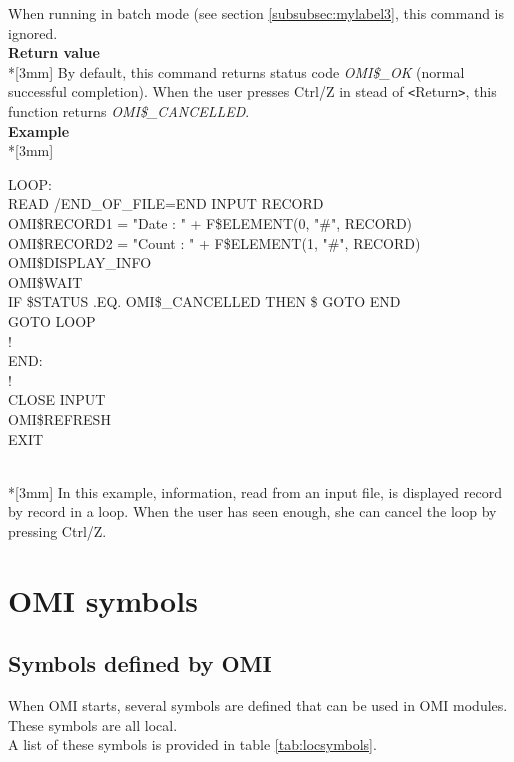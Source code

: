 \documentclass[a4paper]{book}
\newcommand{\vs}{\vspace{3mm}}
\newcommand{\lt}{\texttt{<}}
\newcommand{\gt}{\texttt{>}}
\renewcommand{\indent}{\hspace*{5mm}}
\begin{document}
\vs

When running in batch mode (see section \ref{subsubsec:mylabel3}, this command
is ignored.\\[3mm]
\textbf{Return value}\\*[3mm]
By default, this command returns status code \textsl{OMI{\$}{\_}OK} (normal 
successful completion). When the user presses Ctrl/Z in stead of \lt Return\gt, 
this function returns \textsl{OMI{\$}{\_}CANCELLED}.\\[3mm]
\textbf{Example}\\*[3mm]
\begin{textsf}
\indent{\$}LOOP: \\
\indent{\$} READ /END{\_}OF{\_}FILE=END INPUT RECORD \\
\indent{\$} OMI{\$}RECORD1 = "Date : " + F{\$}ELEMENT(0, "{\#}", RECORD) \\
\indent{\$} OMI{\$}RECORD2 = "Count : " + F{\$}ELEMENT(1, "{\#}", RECORD) \\
\indent{\$} OMI{\$}DISPLAY{\_}INFO \\
\indent{\$} OMI{\$}WAIT \\
\indent{\$} IF {\$}STATUS .EQ. OMI{\$}{\_}CANCELLED THEN {\$} GOTO END \\
\indent{\$} GOTO LOOP \\
\indent{\$}! \\
\indent{\$}END: \\
\indent{\$}! \\
\indent{\$} CLOSE INPUT \\
\indent{\$} OMI{\$}REFRESH \\
\indent{\$} EXIT \\
\end{textsf}\\*[3mm]
In this example, information, read from an input file, is displayed record 
by record in a loop. When the user has seen enough, she can cancel the loop 
by pressing Ctrl/Z.

\section{OMI symbols}
\label{subsec:mylabel7}

\subsection{Symbols defined by OMI}
\label{subsubsec:symbols}


When OMI starts, several symbols are defined that can be used in OMI 
modules. These symbols are all local. \\
A list of these symbols is provided in table \ref{tab:locsymbols}.
\end{document}
